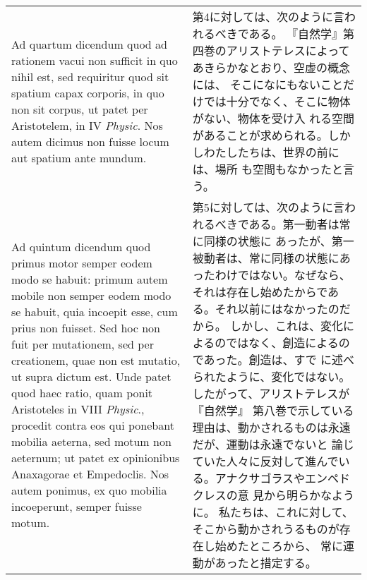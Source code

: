 \documentclass[10pt]{jsarticle} %
\begin{document}
\begin{longtable}{p{21em}p{21em}}
{\sc Ad quartum dicendum} quod ad rationem vacui non sufficit in quo nihil
 est, sed requiritur quod sit spatium capax corporis, in quo non sit
 corpus, ut patet per Aristotelem, in IV {\it Physic}. Nos autem dicimus non
 fuisse locum aut spatium ante mundum.

&

第4に対しては、次のように言われるべきである。
『自然学』第四巻のアリストテレスによってあきらかなとおり、空虚の概念には、
 そこになにもないことだけでは十分でなく、そこに物体がない、物体を受け入
 れる空間があることが求められる。しかしわたしたちは、世界の前には、場所
 も空間もなかったと言う。

\\



Ad quintum dicendum quod primus motor semper eodem modo se habuit: primum
 autem mobile non semper eodem modo se habuit, quia incoepit esse, cum
 prius non fuisset. Sed hoc non fuit per mutationem, sed per creationem,
 quae non est mutatio, ut supra dictum est. Unde patet quod haec ratio,
 quam ponit Aristoteles in VIII {\it Physic}., procedit contra eos qui
 ponebant mobilia aeterna, sed motum non aeternum; ut patet ex
 opinionibus Anaxagorae et Empedoclis. Nos autem ponimus, ex quo mobilia
 incoeperunt, semper fuisse motum.

&
第5に対しては、次のように言われるべきである。第一動者は常に同様の状態に
 あったが、第一被動者は、常に同様の状態にあったわけではない。なぜなら、
 それは存在し始めたからである。それ以前にはなかったのだから。
しかし、これは、変化によるのではなく、創造によるのであった。創造は、すで
 に述べられたように、変化ではない。したがって、アリストテレスが『自然学』
 第八巻で示している理由は、動かされるものは永遠だが、運動は永遠でないと
 論じていた人々に反対して進んでいる。アナクサゴラスやエンペドクレスの意
 見から明らかなように。
私たちは、これに対して、そこから動かされうるものが存在し始めたところから、
 常に運動があったと措定する。


\\




\end{longtable}
\end{document}
